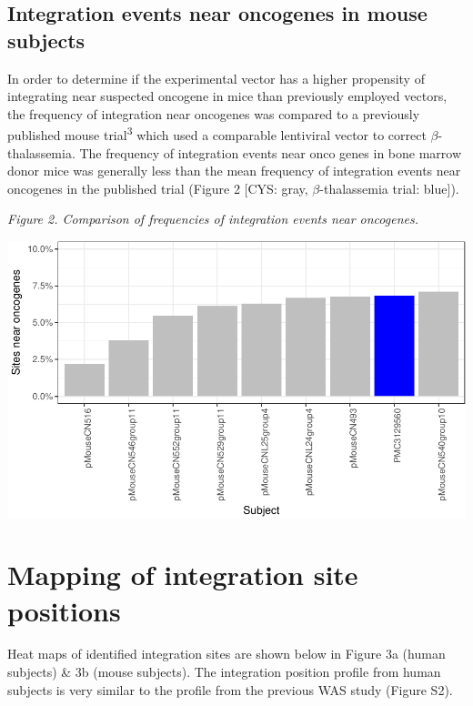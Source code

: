 \documentclass[12pt,]{article}
\begin{document}
\newpage

\subsection{Integration events near oncogenes in mouse
subjects}\label{integration-events-near-oncogenes-in-mouse-subjects}

\vspace{0.1cm}

In order to determine if the experimental vector has a higher propensity
of integrating near suspected oncogene in mice than previously employed
vectors, the frequency of integration near oncogenes was compared to a
previously published mouse trial\textsuperscript{3} which used a
comparable lentiviral vector to correct \(\beta\)-thalassemia. The
frequency of integration events near onco genes in bone marrow donor
mice was generally less than the mean frequency of integration events
near oncogenes in the published trial (Figure 2 {[}CYS: gray,
\(\beta\)-thalassemia trial: blue{]}).

\emph{Figure 2. Comparison of frequencies of integration events near
oncogenes.}

\includegraphics{project_files/figure-latex/fig2-1.pdf}

\newpage

\section{Mapping of integration site
positions}\label{mapping-of-integration-site-positions}

Heat maps of identified integration sites are shown below in Figure 3a
(human subjects) \& 3b (mouse subjects). The integration position
profile from human subjects is very similar to the profile from the
previous WAS study (Figure S2).
\end{document}
